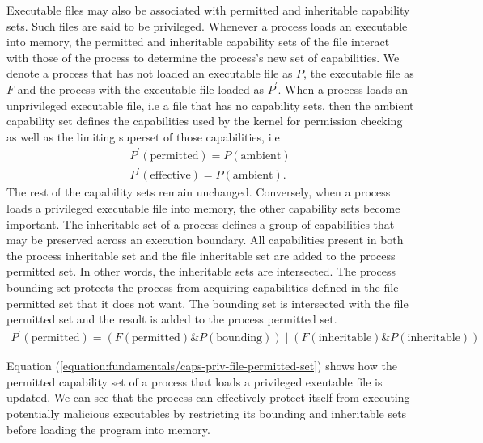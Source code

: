 Executable files may also be associated with permitted and inheritable capability sets. 
Such files are said to be privileged. 
Whenever a process loads an executable into memory, the permitted and inheritable capability 
sets of the file interact with those of the process to determine the process's new set 
of capabilities. We denote a process that has not loaded an executable file as $P$, the executable 
file as $F$ and the process with the executable file loaded as $P^{\prime}$. 
When a process loads an unprivileged executable file, i.e a file that has no capability sets, 
then the ambient capability set defines the capabilities used by the kernel 
for permission checking as well as the limiting superset of those capabilities, i.e 
\begin{align}
    P^{\prime}(\textrm{permitted}) = P(\textrm{ambient}) \\
    P^{\prime}(\textrm{effective}) = P(\textrm{ambient}).
\end{align}
The rest of the capability sets remain unchanged. Conversely, when a process loads a privileged 
executable file into memory, the other capability sets become important. 
The inheritable set of a process 
defines a group of capabilities that may be preserved across an execution boundary. 
All capabilities present in both the process inheritable set and the file inheritable set 
are added to the process permitted set. In other words, the inheritable sets are intersected.
The process bounding set protects the process from acquiring capabilities defined in the file 
permitted set that it does not want. The bounding set is intersected with the file permitted 
set and the result is added to the process permitted set. 
\begin{align}
    P^{\prime}({\textrm{permitted}}) = (F(\textrm{permitted}) \mathbin{\&} P(\textrm{bounding})) \mathbin{|} (F(\textrm{inheritable}) \mathbin{\&} P(\textrm{inheritable}))
    \label{equation:fundamentals/caps-priv-file-permitted-set}
\end{align}

Equation (\ref{equation:fundamentals/caps-priv-file-permitted-set}) shows how the 
permitted capability set of a process that loads a privileged exeutable file is updated. 
We can see that the process can effectively protect itself from executing potentially malicious
executables by restricting its bounding and inheritable sets before loading the program 
into memory. 

